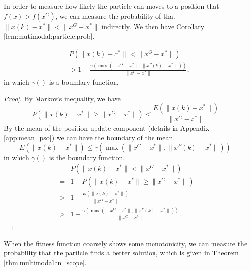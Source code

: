 In order to measure how likely the particle can moves to a position that $ f(x) > f(x^{G}) $, we can measure the probability of that $ \lVert x(k) - x^{*} \rVert < \lVert x^{G} - x^{*} \rVert $ indirectly.
We then have Corollary \ref{lem:mutimodal:particle:prob}.
\begin{mycoro}
\label{lem:mutimodal:particle:prob}
\begin{equation}
\begin{aligned}
& P( \lVert x(k) - x^{*} \rVert < \lVert x^{G} - x^{*} \rVert ) \\
& > 1 - \frac{ \gamma ( \max ( \lVert x^{G} - x^{*} \rVert , \lVert x^{P}(k) - x^{*}  \rVert ) ) }{ \lVert x^{G} - x^{*} \rVert },
\end{aligned}
\end{equation}
in which $ \gamma () $ is a boundary function.
\begin{proof}
By Markov's inequality, we have
\begin{equation}
P( \lVert x(k) - x^{*} \rVert \geq \lVert x^{G} - x^{*} \rVert ) \leq \frac{ E( \lVert x(k) - x^{*} \rVert ) }{ \lVert x^{G} - x^{*} \rVert }.
\end{equation} 
By the mean of the position update component (details in Appendix \ref{app:mean_pso})
we can have the boundary of the mean
\begin{equation}
E( \lVert x(k) - x^{*} \rVert ) \leq \gamma ( \max ( \lVert x^{G} - x^{*} \rVert , \lVert x^{P}(k) - x^{*}  \rVert ) ),
\end{equation}
in which $ \gamma () $ is the boundary function.
\begin{equation}
\begin{aligned}
& P( \lVert x(k) - x^{*} \rVert < \lVert x^{G} - x^{*} \rVert ) \\
= & 1 - P( \lVert x(k) - x^{*} \rVert \geq \lVert x^{G} - x^{*} \rVert ) \\
> & 1 - \frac{ E( \lVert x(k) - x^{*} \rVert ) }{ \lVert x^{G} - x^{*} \rVert } \\
> & 1 - \frac{ \gamma ( \max ( \lVert x^{G} - x^{*} \rVert , \lVert x^{P}(k) - x^{*}  \rVert ) ) }{ \lVert x^{G} - x^{*} \rVert }.
\end{aligned}
\end{equation}
\end{proof}
\end{mycoro}

When the fitness function coarsely shows some monotonicity, we can measure the probability that the particle finds a better solution, which is given in Theorem \ref{thm:multimodal:in_scope}.

